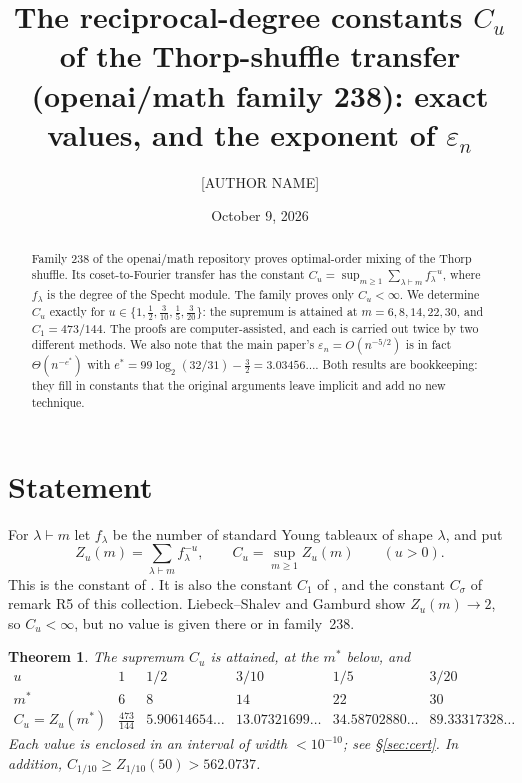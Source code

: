 \documentclass[11pt]{amsart}
\title[Exact reciprocal-degree constants in family 238]{The reciprocal-degree constants $C_u$ of the
Thorp-shuffle transfer (openai/math family 238): exact values, and the exponent of $\varepsilon_n$}
\author{[AUTHOR NAME]}
\date{October 9, 2026}
\newtheorem{theorem}{Theorem}
\theoremstyle{remark}
\begin{document}
\begin{abstract}
Family 238 of the openai/math repository proves optimal-order mixing of the Thorp shuffle. Its
coset-to-Fourier transfer has the constant
$C_u=\sup_{m\ge1}\sum_{\lambda\vdash m}f_\lambda^{-u}$, where $f_\lambda$ is the degree of the Specht module.
The family proves only $C_u<\infty$. We determine $C_u$ exactly for $u\in\{1,\tfrac12,\tfrac3{10},\tfrac15,\tfrac3{20}\}$:
the supremum is attained at $m=6,8,14,22,30$, and $C_1=473/144$. The proofs are computer-assisted, and
each is carried out twice by two different methods. We also note that the main paper's
$\varepsilon_n=O(n^{-5/2})$ is in fact $\Theta(n^{-e^*})$ with $e^*=99\log_2(32/31)-\frac32=3.03456\ldots$. Both results are bookkeeping: they fill in
constants that the original arguments leave implicit and add no new technique.
\end{abstract}
\maketitle

\section{Statement}
For $\lambda\vdash m$ let $f_\lambda$ be the number of standard Young tableaux of shape $\lambda$, and put
\[Z_u(m)=\sum_{\lambda\vdash m}f_\lambda^{-u},\qquad C_u=\sup_{m\ge1}Z_u(m)\qquad(u>0).\]
This is the constant of \cite[degrees.tex, eq.~(l:degree-all-powers-equation); introduction.tex l.~14]{oai-transfer}.
It is also the constant $C_1$ of \cite[main.tex l.~420--424, Lemma \texttt{lem:reciprocal-degrees}]{oai-thorp}, and the constant $C_\sigma$ of
remark R5 of this collection. Liebeck--Shalev \cite{LS04} and Gamburd \cite{Gam06} show $Z_u(m)\to2$, so
$C_u<\infty$, but no value is given there or in family~238.

\begin{theorem}\label{thm:main}
The supremum $C_u$ is attained, at the $m^*$ below, and
\[
\begin{array}{c|ccccc}
u & 1 & 1/2 & 3/10 & 1/5 & 3/20\\\hline
m^* & 6 & 8 & 14 & 22 & 30\\
C_u=Z_u(m^*) & \tfrac{473}{144} & 5.90614654\ldots & 13.07321699\ldots & 34.58702880\ldots & 89.33317328\ldots
\end{array}
\]
Each value is enclosed in an interval of width $<10^{-10}$; see \S\ref{sec:cert}.
In addition, $C_{1/10}\ge Z_{1/10}(50)>562.0737$.
\end{theorem}
\end{document}
